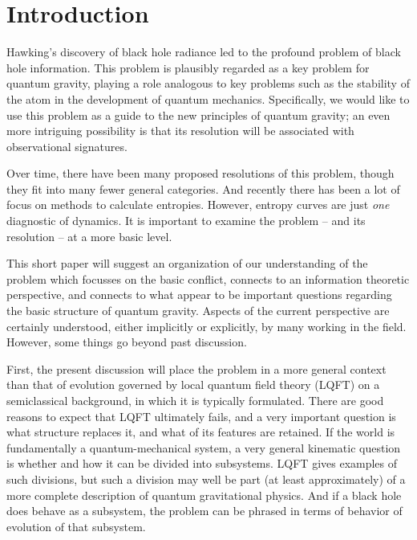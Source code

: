 \documentclass[12pt]{article}
\numberwithin{equation}{section}
\begin{document}
\tableofcontents

\newpage

\section{Introduction}

Hawking's discovery\cite{Hawk} of black hole radiance led to the profound problem of black hole information.  This problem is plausibly  regarded as a key problem for quantum gravity, playing a role analogous to key problems such as the stability of the atom in the development of quantum mechanics.  Specifically, we would like to use this problem as a guide to the new principles of quantum gravity; an even more intriguing possibility is that its resolution will be associated with observational signatures.

Over time, there have been many proposed resolutions of this problem, though they fit into many fewer general categories.  And recently there has been a lot of focus on methods to calculate entropies\cite{AEMM,AMMZ,PSSY,AHMST,AHMSTrev}.  However, entropy curves are just {\it one} diagnostic of dynamics.  It is important to examine the problem -- and its resolution -- at a more basic level.

This short paper will suggest an organization of our understanding of the problem which focusses on the basic conflict,  connects to an information theoretic perspective, and connects to  what appear to be important questions regarding the basic structure of quantum gravity.  Aspects of the current perspective are certainly understood, either implicitly or explicitly, by many working in the field.  However, some things go beyond past discussion.

First, the present discussion will  place the problem in a more general context than that of evolution governed by local quantum field theory (LQFT) on a semiclassical background, in which it is typically formulated.  There are good reasons to expect that LQFT ultimately fails, and a very important question is what structure replaces it, and what of its features are retained.  If the world is fundamentally a quantum-mechanical system, a very general kinematic question is whether and how it can be divided into subsystems.  LQFT gives examples of such divisions, but such a division may well be part  (at least approximately) of a more complete description of quantum gravitational physics.  And if a black hole does behave as a subsystem, the problem can be phrased in terms of behavior of evolution of that subsystem.
\end{document}
